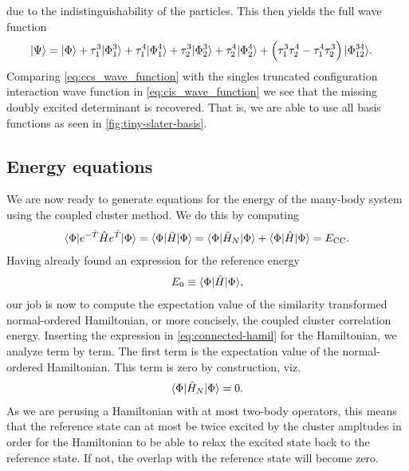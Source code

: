             due to the indistinguishability of the particles.
            This then yields the full wave function
            \begin{align}
                | \Psi \rangle
                &= | \Phi \rangle
                + \tau^{3}_{1}| \Phi^{3}_{1} \rangle
                + \tau^{4}_{1}| \Phi^{4}_{1} \rangle
                + \tau^{3}_{2}| \Phi^{3}_{2} \rangle
                + \tau^{4}_{2}| \Phi^{4}_{2} \rangle
                + \left( 
                    \tau^{3}_{1}\tau^{4}_{2}
                    - \tau^{4}_{1}\tau^{3}_{2}
                 \right)
                | \Phi^{34}_{12} \rangle.
                \label{eq:ccs_wave_function}
            \end{align}
            Comparing \autoref{eq:ccs_wave_function} with the singles truncated
            configuration interaction wave function in
            \autoref{eq:cis_wave_function} we see that the missing doubly
            excited determinant is recovered.
            That is, we are able to use all basis functions as seen in
            \autoref{fig:tiny-slater-basis}.

        \subsection{Energy equations}
            We are now ready to generate equations for the energy of the
            many-body system using the coupled cluster method.
            We do this by computing
            \begin{align}
                \langle \Phi |e^{-\hat{T}}\hat{H} e^{\hat{T}}| \Phi \rangle
                = \langle \Phi |\bar{H}| \Phi \rangle
                = \langle \Phi |\bar{H}_N| \Phi \rangle
                + \langle \Phi |\hat{H}| \Phi \rangle
                = E_{\text{CC}}.
            \end{align}
            Having already found an expression for the reference energy
            \begin{align}
                E_{0} \equiv \langle \Phi |\hat{H}| \Phi \rangle,
            \end{align}
            our job is now to compute the expectation value of the similarity
            transformed normal-ordered Hamiltonian, or more concisely, the
            coupled cluster correlation energy.
            Inserting the expression in \autoref{eq:connected-hamil} for the
            Hamiltonian, we analyze term by term.
            The first term is the expectation value of the normal-ordered
            Hamiltonian.
            This term is zero by construction, viz.
            \begin{align}
                \langle \Phi |\hat{H}_N| \Phi \rangle = 0.
            \end{align}
            As we are perusing a Hamiltonian with at most two-body operators,
            this means that the reference state can at most be twice excited by
            the cluster ampltudes in order for the Hamiltonian to be able to
            relax the excited state back to the reference state.
            If not, the overlap with the reference state will become zero.


